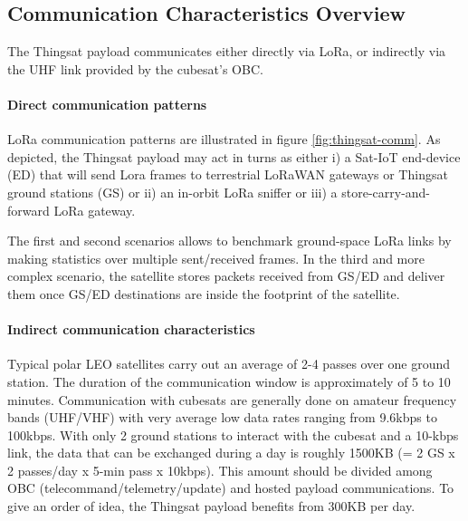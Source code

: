 \subsection{Communication Characteristics Overview}

The Thingsat payload communicates either directly via LoRa, or indirectly via the UHF link provided by the cubesat's OBC.

\paragraph*{Direct communication patterns} LoRa communication patterns are illustrated in figure \ref{fig:thingsat-comm}.
As depicted, the Thingsat payload may act in turns as either 
i) a Sat-IoT end-device (ED) that will send Lora frames to terrestrial LoRaWAN gateways or Thingsat ground
stations (GS) or 
ii) an in-orbit LoRa sniffer or iii) a store-carry-and-forward LoRa gateway.

The first and second scenarios allows to benchmark ground-space LoRa links by
making statistics over multiple sent/received frames. In the third and more
complex scenario, the satellite stores packets received from GS/ED and deliver
them once GS/ED destinations are inside the footprint of the satellite.

\paragraph*{Indirect communication characteristics} Typical polar LEO satellites carry out an average of 2-4 passes over one ground
station. The duration of the communication window is approximately of 5 to 10
minutes. Communication with cubesats are generally done on amateur frequency
bands (UHF/VHF) with very average low data rates ranging from 9.6kbps to
100kbps. With only 2 ground stations to interact with the cubesat and a 10-kbps
link, the data that can be exchanged during a day is roughly 1500KB (= 2 GS x 2
passes/day x 5-min pass x 10kbps). This amount should be divided among OBC
(telecommand/telemetry/update) and hosted payload communications. To give an
order of idea, the Thingsat payload benefits from 300KB per day. 


